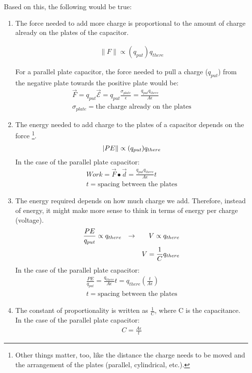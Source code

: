 Based on this, the following would be true:

\begin{enumerate}
\item The force needed to add more charge is proportional to the amount of charge already on the plates of the capacitor. \par 

\begin{align}
\|F\| \propto (q_{put})q_{there} \label{E:6CL0}
\end{align}

For a parallel plate capacitor, the force needed to pull a charge ($q_{put}$) from the negative plate towards the positive plate would be:
\begin{align*}
\vec{F}=q_{put}\vec{\mathcal{E}}=q_{put}\frac{\sigma_{plate}}{\epsilon}=\frac{q_{put}q_{there}}{A\epsilon}\\
\sigma_{plate} = \text{the charge already on the plates}
\end{align*}

\item The energy needed to add charge to the plates of a capacitor depends on the force \footnote{Other things matter, too, like the distance the charge needs to be moved and the arrangement of the plates (parallel, cylindrical, etc.).}.
\begin{align}
|PE\|  \propto (q_{put})q_{there} \notag
\end{align}
In the case of the parallel plate capacitor:
\begin{align*}
Work=\vec{F}\bullet \vec{d} = \frac{q_{put}q_{there}}{A\epsilon}t\\
t = \text{spacing between the plates}
\end{align*}

\item The energy required depends on how much charge we add. Therefore, instead of energy, it might make more sense to think in terms of energy per charge (voltage).
\begin{align}
\frac{PE}{q_{put}} \propto q_{there}&&\rightarrow&&V \propto q_{there} \notag \\
&&&&V= \frac{1}{C} q_{there} \label{E:6CL}
\end{align}
In the case of the parallel plate capacitor:
\begin{align*}
\frac{PE}{q_{put}} = \frac{q_{there}}{A\epsilon}t=q_{there}(\frac{t}{A\epsilon})\\
t = \text{spacing between the plates}
\end{align*}
\item The constant of proportionality is written as $\frac{1}{C}$, where C is the capacitance.
In the case of the parallel plate capacitor:
\begin{align*}
C = \frac{A\epsilon}{t}
\end{align*}
\end{enumerate}

